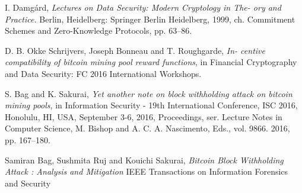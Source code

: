 \documentclass[12pt]{article}
\begin{document}
\begin{thebibliography}{9}
 I. Damg{\'a}rd, 
 \textit{Lectures on Data Security: Modern Cryptology in The- ory and Practice.} Berlin, Heidelberg: Springer Berlin Heidelberg, 1999, ch. Commitment Schemes and Zero-Knowledge Protocols, pp. 63–86.
 
 D. B. Okke Schrijvers, Joseph Bonneau and T. Roughgarde, 
 \textit{In- centive compatibility of bitcoin mining pool reward functions}, in Financial Cryptography and Data Security: FC 2016 International Workshops.
 
 S. Bag and K. Sakurai, 
 \textit{Yet another note on block withholding attack on bitcoin mining pools}, in Information Security - 19th International Conference, ISC 2016, Honolulu, HI, USA, September 3-6, 2016, Proceedings, ser. Lecture Notes in Computer Science,
 M. Bishop and A. C. A. Nascimento, Eds., vol. 9866. 2016, pp. 167–180.
 
 Samiran Bag, Sushmita Ruj and Kouichi Sakurai,
\textit{Bitcoin Block Withholding Attack : Analysis and
Mitigation}
IEEE Transactions on Information Forensics and Security
\end{thebibliography}
\end{document}
